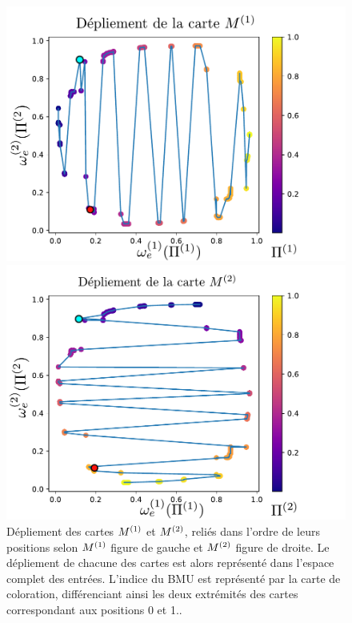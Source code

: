 \documentclass[../main]{subfiles}
\begin{document}
\begin{figure}
    \begin{minipage}{0.49\textwidth}
    \includegraphics[width=\textwidth]{disto_cercle_M1.pdf}
    \end{minipage}
    \begin{minipage}{0.49\textwidth}
    \includegraphics[width=\textwidth]{disto_cercle_M2.pdf}
    \end{minipage}
    \caption{Dépliement des cartes $M^{({1})}$ et $M^{({2})}$, reliés dans l'ordre de leurs positions selon $M^{({1})}$ figure de gauche et $M^{({2})}$ figure de droite. Le dépliement de chacune des cartes est alors représenté dans l'espace complet des entrées. L'indice du BMU est représenté par la carte de coloration, différenciant ainsi les deux extrémités des cartes correspondant aux positions 0 et 1.\label{fig:distortion}.}
    \end{figure}
\end{document}
